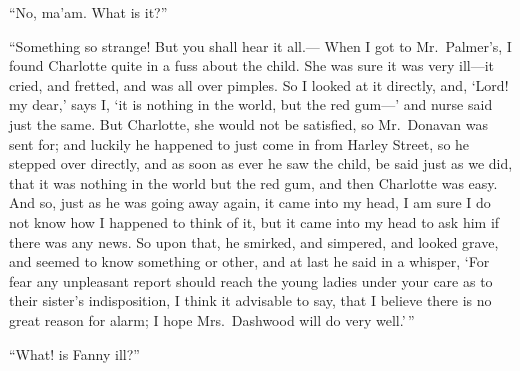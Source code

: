 \documentclass{article}
\begin{document}
``No, ma'am.  What is it?''

``Something so strange!  But you shall hear it all.---%
When I got to Mr.\ Palmer's, I found Charlotte quite
in a fuss about the child.  She was sure it was very
ill---it cried, and fretted, and was all over pimples.
So I looked at it directly, and, `Lord! my dear,'
says I, `it is nothing in the world, but the red gum---'
and nurse said just the same.  But Charlotte, she would
not be satisfied, so Mr.\ Donavan was sent for; and luckily
he happened to just come in from Harley Street, so he
stepped over directly, and as soon as ever he saw the child,
be said just as we did, that it was nothing in the world
but the red gum, and then Charlotte was easy.  And so,
just as he was going away again, it came into my head,
I am sure I do not know how I happened to think of it,
but it came into my head to ask him if there was any news.
So upon that, he smirked, and simpered, and looked grave,
and seemed to know something or other, and at last he
said in a whisper, `For fear any unpleasant report
should reach the young ladies under your care as to their
sister's indisposition, I think it advisable to say,
that I believe there is no great reason for alarm; I hope
Mrs.\ Dashwood will do very well.'\,''

``What! is Fanny ill?''
\end{document}
